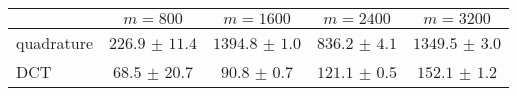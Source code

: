 \centering
\renewcommand{\arraystretch}{1.2}
\begin{tabular}{@{}lcccc@{}}
\toprule
 & $m=800$ & $m=1600$ & $m=2400$ & $m=3200$\\
\midrule
quadrature & $226.9$ $\pm$ $11.4$ & $1394.8$ $\pm$ $1.0$ & $836.2$ $\pm$ $4.1$ & $1349.5$ $\pm$ $3.0$ \\
DCT & $68.5$ $\pm$ $20.7$ & $90.8$ $\pm$ $0.7$ & $121.1$ $\pm$ $0.5$ & $152.1$ $\pm$ $1.2$ \\
\bottomrule
\end{tabular}
